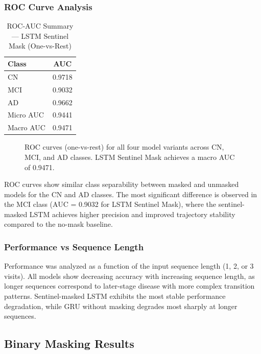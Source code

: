 \documentclass[12pt,singleside,a4paper]{article}
\begin{document}
\subsubsection{ROC Curve Analysis}

\begin{table}[h]
\centering
\caption{ROC-AUC Summary --- LSTM Sentinel Mask (One-vs-Rest)}
\begin{tabular}{lc}
\toprule
\textbf{Class} & \textbf{AUC} \\
\midrule
CN  & 0.9718 \\
MCI & 0.9032 \\
AD  & 0.9662 \\
\midrule
Micro AUC & 0.9441 \\
Macro AUC & 0.9471 \\
\bottomrule
\end{tabular}
\label{tab:roc_auc}
\end{table}

\begin{figure}[h]
\centering
\caption{ROC curves (one-vs-rest) for all four model variants across CN, MCI, and AD classes. LSTM Sentinel Mask achieves a macro AUC of 0.9471.}
\label{fig:roc}
\end{figure}

ROC curves show similar class separability between masked and unmasked models for the CN and AD classes. The most significant difference is observed in the MCI class (AUC = 0.9032 for LSTM Sentinel Mask), where the sentinel-masked LSTM achieves higher precision and improved trajectory stability compared to the no-mask baseline.

\subsubsection{Performance vs Sequence Length}

Performance was analyzed as a function of the input sequence length (1, 2, or 3 visits). All models show decreasing accuracy with increasing sequence length, as longer sequences correspond to later-stage disease with more complex transition patterns. Sentinel-masked LSTM exhibits the most stable performance degradation, while GRU without masking degrades most sharply at longer sequences.

\subsection{Binary Masking Results}
\end{document}
